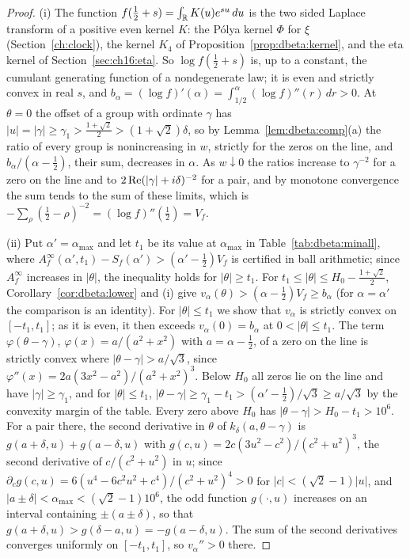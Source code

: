 \begin{proof}
(i) The function $f(\frac12+s)=\int_{\mathbb{R}}K(u)e^{su}\,du$ is the two sided Laplace transform of a positive even kernel $K$: the P\'olya kernel $\Phi$ for $\xi$ (Section~\ref{ch:clock}), the kernel $K_4$ of Proposition~\ref{prop:dbeta:kernel}, and the eta kernel of Section~\ref{sec:ch16:eta}. So $\log f(\frac12+s)$ is, up to a constant, the cumulant generating function of a nondegenerate law; it is even and strictly convex in real $s$, and $b_\alpha=(\log f)'(\alpha)=\int_{1/2}^\alpha(\log f)''(r)\,dr>0$. At $\theta=0$ the offset of a group with ordinate $\gamma$ has $|u|=|\gamma|\ge\gamma_1>\frac{1+\sqrt2}2>(1+\sqrt2)\delta$, so by Lemma~\ref{lem:dbeta:comp}(a) the ratio of every group is nonincreasing in $w$, strictly for the zeros on the line, and $b_\alpha/(\alpha-\frac12)$, their sum, decreases in $\alpha$. As $w\downarrow0$ the ratios increase to $\gamma^{-2}$ for a zero on the line and to $2\operatorname{Re}(|\gamma|+i\delta)^{-2}$ for a pair, and by monotone convergence the sum tends to the sum of these limits, which is $-\sum_\rho(\frac12-\rho)^{-2}=(\log f)''(\frac12)=V_f$.

(ii) Put $\alpha'=\alpha_{\max}$ and let $t_1$ be its value at $\alpha_{\max}$ in Table~\ref{tab:dbeta:minall}, where $A^\infty_f(\alpha',t_1)-S_f(\alpha')>(\alpha'-\frac12)V_f$ is certified in ball arithmetic; since $A^\infty_f$ increases in $|\theta|$, the inequality holds for $|\theta|\ge t_1$. For $t_1\le|\theta|\le H_0-\frac{1+\sqrt2}2$, Corollary~\ref{cor:dbeta:lower} and (i) give $v_\alpha(\theta)>(\alpha-\frac12)V_f\ge b_\alpha$ (for $\alpha=\alpha'$ the comparison is an identity). For $|\theta|\le t_1$ we show that $v_\alpha$ is strictly convex on $[-t_1,t_1]$; as it is even, it then exceeds $v_\alpha(0)=b_\alpha$ at $0<|\theta|\le t_1$. The term $\varphi(\theta-\gamma)$, $\varphi(x)=a/(a^2+x^2)$ with $a=\alpha-\frac12$, of a zero on the line is strictly convex where $|\theta-\gamma|>a/\sqrt3$, since $\varphi''(x)=2a(3x^2-a^2)/(a^2+x^2)^3$. Below $H_0$ all zeros lie on the line and have $|\gamma|\ge\gamma_1$, and for $|\theta|\le t_1$, $|\theta-\gamma|\ge\gamma_1-t_1>(\alpha'-\frac12)/\sqrt3\ge a/\sqrt3$ by the convexity margin of the table. Every zero above $H_0$ has $|\theta-\gamma|>H_0-t_1>10^6$. For a pair there, the second derivative in $\theta$ of $k_\delta(a,\theta-\gamma)$ is $g(a+\delta,u)+g(a-\delta,u)$ with $g(c,u)=2c(3u^2-c^2)/(c^2+u^2)^3$, the second derivative of $c/(c^2+u^2)$ in $u$; since $\partial_cg(c,u)=6(u^4-6c^2u^2+c^4)/(c^2+u^2)^4>0$ for $|c|<(\sqrt2-1)|u|$, and $|a\pm\delta|<\alpha_{\max}<(\sqrt2-1)10^6$, the odd function $g(\cdot,u)$ increases on an interval containing $\pm(a\pm\delta)$, so that $g(a+\delta,u)>g(\delta-a,u)=-g(a-\delta,u)$. The sum of the second derivatives converges uniformly on $[-t_1,t_1]$, so $v_\alpha''>0$ there.


\end{proof}
